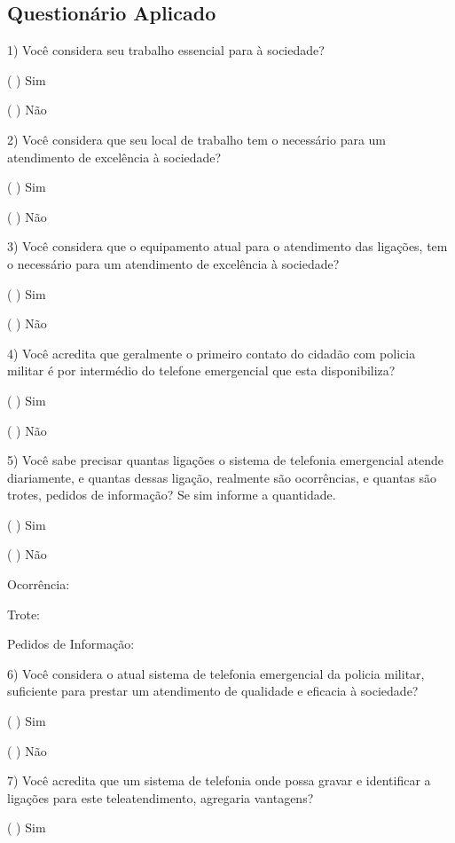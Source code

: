 \documentclass[12pt,openright,oneside,a4paper,brazil]{abntex2}
\begin{document}
\begin{anexosenv}

\partanexos

\chapter{Questionário Aplicado}

1) Você considera seu trabalho essencial para à sociedade?

( ) Sim

( ) Não

2) Você considera que seu local de trabalho tem o necessário para um atendimento de excelência à sociedade?

( ) Sim

( ) Não

3) Você considera que o equipamento atual para o atendimento das ligações, tem o necessário para um atendimento de excelência à sociedade?

( ) Sim

( ) Não

4) Você acredita que geralmente o primeiro contato do cidadão com policia militar é por intermédio do telefone emergencial que esta disponibiliza?

( ) Sim

( ) Não

5) Você sabe precisar quantas ligações o sistema de telefonia emergencial atende diariamente, e quantas dessas ligação, realmente são ocorrências, e quantas são trotes, pedidos de informação?
Se sim informe a quantidade.

( ) Sim

( ) Não

Ocorrência:\hrulefill

Trote:\hrulefill

Pedidos de Informação:\hrulefill

6) Você considera o atual sistema de telefonia emergencial da policia militar, suficiente para prestar um atendimento de qualidade e eficacia à sociedade?

( ) Sim

( ) Não

7) Você acredita que um sistema de telefonia onde possa gravar e identificar a ligações para este teleatendimento, agregaria vantagens?

( ) Sim


\end{anexosenv}
\end{document}
